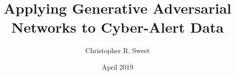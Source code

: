 \newsavebox{\mybox}\newsavebox{\mysim}
\newcommand{\distas}[1]{%
  \savebox{\mybox}{\hbox{$\scriptstyle#1$}}%
  \savebox{\mysim}{\hbox{$\sim$}}%
  \mathbin{\overset{#1}{\resizebox{\wd\mybox}{\ht\mysim}{$\sim$}}}%
}

\newcommand{\etc} {\emph{etc.\/}}
\newcommand{\etal}{\emph{et~al.\/}}
\newcommand{\eg}  {\emph{e.g.\/}}
\newcommand{\ie}  {\emph{i.e.\/}}



\graphicspath{{figs/}
	{01_introduction/figs/}
	{02_related_works/figs/}
	{03_methodology/figs/}
	{04_design_implementation/figs/}
	{05_results_and_analysis/figs/}
}

\author{Christopher R. Sweet}
\title{Applying Generative Adversarial Networks to Cyber-Alert Data}
\date{April 2019}





\makeglossaries
{}

\makeindex

% 


	
	
	
	
	
	
	
	
	
	
	

